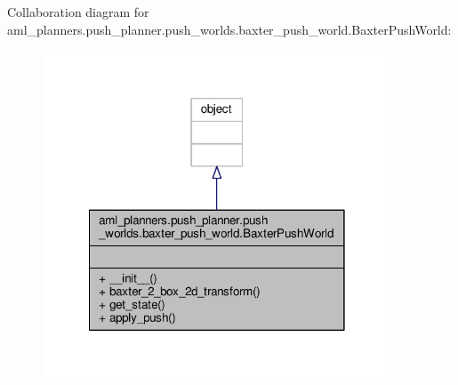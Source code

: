 Collaboration diagram for aml\-\_\-planners.\-push\-\_\-planner.\-push\-\_\-worlds.\-baxter\-\_\-push\-\_\-world.\-Baxter\-Push\-World\-:\nopagebreak
\begin{figure}[H]
\begin{center}
\leavevmode
\includegraphics[width=294pt]{classaml__planners_1_1push__planner_1_1push__worlds_1_1baxter__push__world_1_1_baxter_push_world__coll__graph}
\end{center}
\end{figure}
